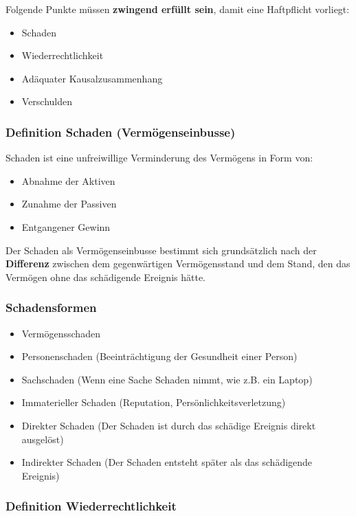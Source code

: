 Folgende Punkte müssen \textbf{zwingend erfüllt sein}, damit eine Haftpflicht
vorliegt:

\begin{itemize}
\tightlist
\item Schaden
\item Wiederrechtlichkeit
\item Adäquater Kausalzusammenhang
\item Verschulden
\end{itemize}


\subsubsection{Definition Schaden (Vermögenseinbusse)}

Schaden ist eine unfreiwillige Verminderung des Vermögens in Form von:
\begin{itemize}
	\tightlist
	\item Abnahme der Aktiven
	\item Zunahme der Passiven
	\item Entgangener Gewinn
\end{itemize}

Der Schaden als Vermögenseinbusse bestimmt sich grundsätzlich nach
der \textbf{Differenz} zwischen dem gegenwärtigen Vermögensstand und dem Stand,
den das Vermögen ohne das schädigende Ereignis hätte.


\subsubsection{Schadensformen}

\begin{itemize}
	\tightlist
	\item Vermögensschaden
	\item Personenschaden (Beeinträchtigung der Gesundheit einer Person)
	\item Sachschaden (Wenn eine Sache Schaden nimmt, wie z.B. ein Laptop)
	\item Immaterieller Schaden (Reputation, Persönlichkeitsverletzung)
	\item Direkter Schaden (Der Schaden ist durch das schädige Ereignis direkt
	ausgelöst)
	\item Indirekter Schaden (Der Schaden entsteht später als das schädigende
	Ereignis)
\end{itemize}


\subsubsection{Definition Wiederrechtlichkeit}

